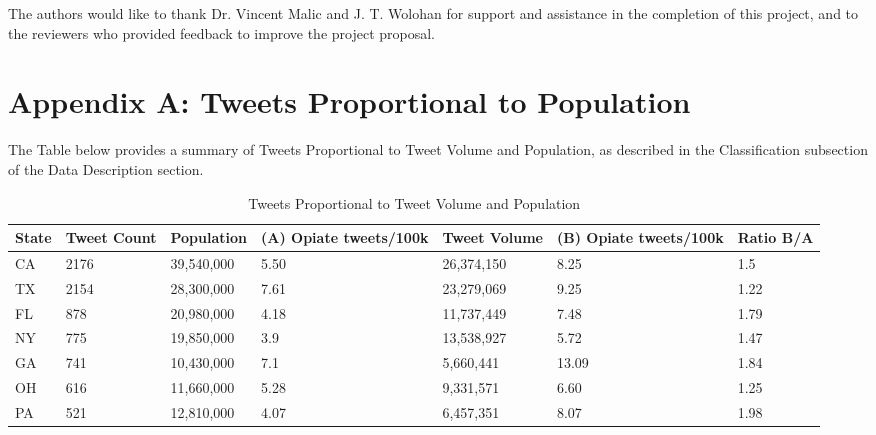 \documentclass[sigconf]{acmart}
\begin{document}
 
 

\begin{acks}
  The authors would like to thank Dr. Vincent Malic and J. T. Wolohan 
  for support and assistance in the completion of this project, and to the
  reviewers who provided feedback to improve the project proposal.
\end{acks}


 


\appendix

\section{Appendix A: Tweets Proportional to Population}
The Table below provides a summary of Tweets Proportional to Tweet 
Volume and Population, as described in the Classification subsection of 
the Data Description section.

\begin{table}[ht]
\centering
\caption{Tweets Proportional to Tweet Volume and Population}
\label{tab:1}
  \begin{tabular}{lllllll}
    \toprule
    State & Tweet Count & Population & (A) Opiate tweets/100k & Tweet Volume & 
    (B) Opiate tweets/100k & Ratio B/A \\
    \midrule     
    CA& 2176& 39,540,000& 5.50& 26,374,150& 8.25& 1.5 \\
    TX& 2154& 28,300,000& 7.61& 23,279,069& 9.25& 1.22 \\
    FL& 878& 20,980,000& 4.18& 11,737,449& 7.48& 1.79 \\
    NY& 775& 19,850,000& 3.9& 13,538,927& 5.72& 1.47 \\
    GA& 741& 10,430,000& 7.1& 5,660,441& 13.09& 1.84 \\
    OH& 616& 11,660,000& 5.28& 9,331,571& 6.60 & 1.25 \\
    PA& 521& 12,810,000& 4.07& 6,457,351& 8.07& 1.98 \\	
    \bottomrule
  \end{tabular}
\end{table}





%
\end{document}
